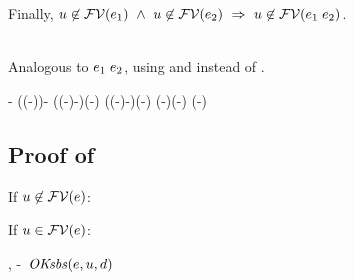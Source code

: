 \begin{bycase}
\noindent
Finally,
$u\not\in\mathcal{FV}(e_1)\ \wedge\ u\not\in\mathcal{FV}(e_2)\ \Rightarrow\ 
 u\not\in\mathcal{FV}(e_1\;e_2)$.

\Case{$\eqO$, $\iifO$}\\
Analogous to $e_1\;e_2$, using  and 
instead of .

\Case{$\absO$}
\begin{derivation}
\step{\varI\in\efvar{\absO}}{\hyp}
\step{\esbsokO{\absO}}{\hyp}
\steP
{\efvar{\esbsO{(\absO)}}
 \efvar{\abs{\var}{\typ}{\esbsO{\expr}}}
 \linK{=}
 \efvar{\esbsO{\expr}}-\setI{\var}
 ((\efvar{\expr}-\setI{\varI})\cup\efvar{\exprI})-\setI{\var}
 \linK{=}
 ((\efvar{\expr}-\setI{\varI})-\setI{\var})\cup(\efvar{\exprI}-\setI{\var})
 \linK{=}
 ((\efvar{\expr}-\setI{\var})-\setI{\varI})\cup(\efvar{\exprI}-\setI{\var})
 (\efvar{\absO}-\setI{\varI})\cup(\efvar{\exprI}-\setI{\var})
 (\efvar{\absO}-\setI{\varI})\cup\efvar{\exprI}}
\end{derivation}
\end{bycase}



\subsection*{Proof of }

If $u\not\in\mathcal{FV}(e)$:
\begin{derivation}
\end{derivation}

\noindent
If $u\in\mathcal{FV}(e)$:
\begin{derivation}
\step{\efvar{\esbsO{\expr}}=(\efvar{\expr}-\setI{\varI})\cup\efvar{\exprI}}
     {, \hyp\ $\mathit{OKsbs}(e,u,d)$}
\steP{\varI\not\in\efvar{\expr}-\setI{\varI}}
\step{\varI\not\in\efvar{\exprI}}{\hyp}
\end{derivation}




